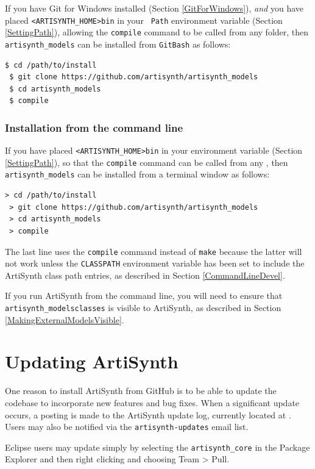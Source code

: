 If you have Git for Windows installed (Section \ref{GitForWindows}),
{\it and} you have placed {\tt <ARTISYNTH\_HOME>\SEP bin} in your {\tt
Path} environment variable (Section \ref{SettingPath}), allowing
the {\tt compile} command to be called from any folder, then {\tt
artisynth\_models} can be installed from {\tt GitBash} as follows:
%
\begin{lstlisting}[]
 $ cd /path/to/install
 $ git clone https://github.com/artisynth/artisynth_models
 $ cd artisynth_models
 $ compile
\end{lstlisting}
%
\else
\subsubsection{Installation from the command line}
If you have placed {\tt <ARTISYNTH\_HOME>\SEP bin} in your \PATH{}
environment variable (Section \ref{SettingPath}), so that the
{\tt compile} command can be called from any \directory{}, then {\tt
artisynth\_models} can be installed from a terminal window as follows:
%
\begin{lstlisting}[]
 > cd /path/to/install
 > git clone https://github.com/artisynth/artisynth_models
 > cd artisynth_models
 > compile
\end{lstlisting}
%
\fi
The last line uses the {\tt compile} command instead of {\tt make}
because the latter will not work unless the {\tt CLASSPATH}
environment variable has been set to include the ArtiSynth class path
entries, as described in Section \ref{CommandLineDevel}.

If you run ArtiSynth from the command line, you will need to ensure
that {\tt artisynth\_models\SEP classes} is visible to ArtiSynth, as
described in Section \ref{MakingExternalModelsVisible}.

\section{Updating ArtiSynth}
\label{UpdatingArtiSynth}

One reason to install ArtiSynth from GitHub is to be able to update
the codebase to incorporate new features and bug fixes.  When a
significant update occurs, a posting is made to the ArtiSynth update
log, currently located at
.
Users may also be notified via the {\tt artisynth-updates} email list.

Eclipse users may update simply by selecting the {\tt artisynth\_core}
in the {\sf Package Explorer} and then right clicking and choosing
{\sf Team > Pull}.

